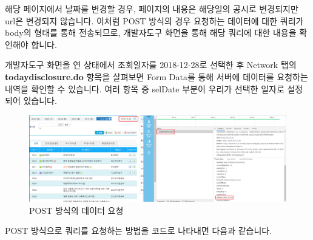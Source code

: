 \documentclass[12pt,]{book}
\begin{document}
해당 페이지에서 날짜를 변경할 경우, 페이지의 내용은 해당일의 공시로 변경되지만 url은 변경되지 않습니다. 이처럼 POST 방식의 경우 요청하는 데이터에 대한 쿼리가 body의 형태를 통해 전송되므로, 개발자도구 화면을 통해 해당 쿼리에 대한 내용을 확인해야 합니다.

개발자도구 화면을 연 상태에서 조회일자를 2018-12-28로 선택한 후 Network 탭의 \textbf{todaydisclosure.do} 항목을 살펴보면 Form Data를 통해 서버에 데이터를 요청하는 내역을 확인할 수 있습니다. 여러 항목 중 selDate 부분이 우리가 선택한 일자로 설정되어 있습니다.

\begin{figure}[h]

{\centering \includegraphics[width=1\linewidth]{images/crawl_kind_post} 

}

\caption{POST 방식의 데이터 요청}\label{fig:unnamed-chunk-14}
\end{figure}

POST 방식으로 쿼리를 요청하는 방법을 코드로 나타내면 다음과 같습니다.
\end{document}
